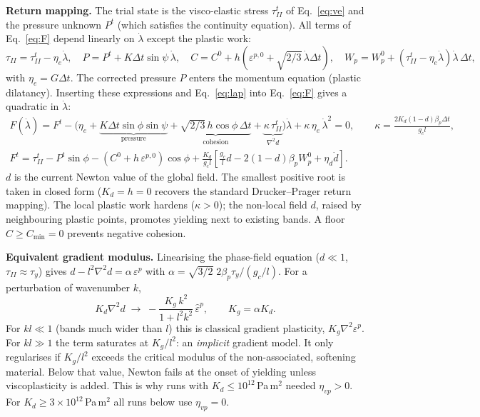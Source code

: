 \documentclass[10pt,a4paper]{article}
\begin{document}
\textbf{Return mapping.} The trial state is the visco-elastic stress $\tau_{II}^t$ of Eq.~\eqref{eq:ve} and the
pressure unknown $P^t$ (which satisfies the continuity equation). All terms of Eq.~\eqref{eq:F} depend linearly on
$\dot\lambda$ except the plastic work:
\begin{equation}
\tau_{II} = \tau_{II}^t - \eta_e\dot\lambda,\quad
P = P^t + K\Delta t\sin\psi\,\dot\lambda,\quad
C = C^0 + h\left(\varepsilon^{p,0} + \sqrt{2/3}\,\dot\lambda\Delta t\right),\quad
W_p = W_p^0 + \left(\tau_{II}^t - \eta_e\dot\lambda\right)\dot\lambda\,\Delta t,
\end{equation}
with $\eta_e = G\Delta t$. The corrected pressure $P$ enters the momentum equation (plastic dilatancy). Inserting
these expressions and Eq.~\eqref{eq:lap} into Eq.~\eqref{eq:F} gives a quadratic in $\dot\lambda$:
\begin{gather}
F(\dot\lambda) = F^t - \Big(\eta_e + \underbrace{K\Delta t\sin\phi\sin\psi}_{\text{pressure}}
+ \underbrace{\sqrt{2/3}\,h\cos\phi\,\Delta t}_{\text{cohesion}} + \underbrace{\kappa\,\tau_{II}^t}_{\nabla^2 d}\Big)\dot\lambda
+ \kappa\,\eta_e\,\dot\lambda^2 = 0,\qquad \kappa = \frac{2K_d(1-d)\beta_p\Delta t}{g_c l},\label{eq:quad}\\
F^t = \tau_{II}^t - P^t\sin\phi - \left(C^0 + h\,\varepsilon^{p,0}\right)\cos\phi
+ \frac{K_d}{g_c l}\left[\frac{g_c}{l}d - 2(1-d)\beta_p W_p^0 + \eta_d\dot d\right].\nonumber
\end{gather}
$d$ is the current Newton value of the global field. The smallest positive root is taken in closed form ($K_d=h=0$
recovers the standard Drucker--Prager return mapping). The local plastic work hardens ($\kappa>0$); the non-local
field $d$, raised by neighbouring plastic points, promotes yielding next to existing bands. A floor
$C\ge C_{\min}=0$ prevents negative cohesion.

\textbf{Equivalent gradient modulus.} Linearising the phase-field equation ($d\ll1$, $\tau_{II}\approx\tau_y$) gives
$d - l^2\nabla^2 d = \alpha\,\varepsilon^p$ with $\alpha = \sqrt{3/2}\;2\beta_p\tau_y/(g_c/l)$. For a perturbation of
wavenumber $k$,
\begin{equation}
K_d\nabla^2 d \;\longrightarrow\; -\frac{K_g\,k^2}{1 + l^2k^2}\,\hat\varepsilon^p,\qquad K_g = \alpha K_d .
\label{eq:Kg}
\end{equation}
For $kl\ll1$ (bands much wider than $l$) this is classical gradient plasticity, $K_g\nabla^2\varepsilon^p$. For
$kl\gg1$ the term saturates at $K_g/l^2$: an \emph{implicit} gradient model. It only regularises if $K_g/l^2$ exceeds
the critical modulus of the non-associated, softening material. Below that value, Newton fails at the onset of
yielding unless viscoplasticity is added. This is why runs with $K_d\le10^{12}$\,Pa\,m$^2$ needed $\eta_{vp}>0$. For
$K_d\ge3\times10^{12}$\,Pa\,m$^2$ all runs below use $\eta_{vp}=0$.
\end{document}
